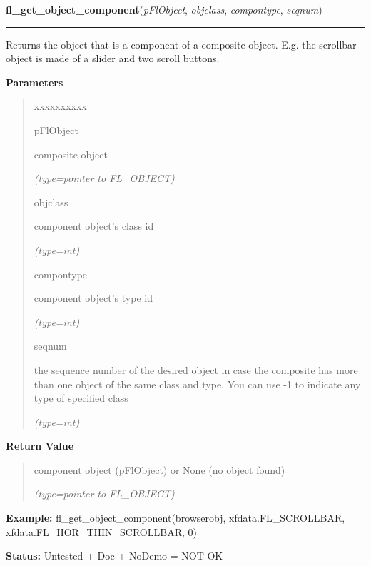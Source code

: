 \hspace{.8\funcindent}\begin{boxedminipage}{\funcwidth}

    \raggedright \textbf{fl\_get\_object\_component}(\textit{pFlObject}, \textit{objclass}, \textit{compontype}, \textit{seqnum})

    \vspace{-1.5ex}

    \rule{\textwidth}{0.5\fboxrule}
\setlength{\parskip}{2ex}
    Returns the object that is a component of a composite object. E.g. the 
    scrollbar object is made of a slider and two scroll buttons.

\setlength{\parskip}{1ex}
      \textbf{Parameters}
      \vspace{-1ex}

      \begin{quote}
        \begin{Ventry}{xxxxxxxxxx}

          \item[pFlObject]

          composite object

            {\it (type=pointer to FL\_OBJECT)}

          \item[objclass]

          component object's class id

            {\it (type=int)}

          \item[compontype]

          component object's type id

            {\it (type=int)}

          \item[seqnum]

          the sequence number of the desired object in case the composite 
          has more than one object of the same class and type. You can use 
          -1 to indicate any type of specified class

            {\it (type=int)}

        \end{Ventry}

      \end{quote}

      \textbf{Return Value}
    \vspace{-1ex}

      \begin{quote}
      component object (pFlObject) or None (no object found)

      {\it (type=pointer to FL\_OBJECT)}

      \end{quote}

\textbf{Example:} fl\_get\_object\_component(browserobj, xfdata.FL\_SCROLLBAR, 
xfdata.FL\_HOR\_THIN\_SCROLLBAR, 0)



\textbf{Status:} Untested + Doc + NoDemo = NOT OK



    \end{boxedminipage}

